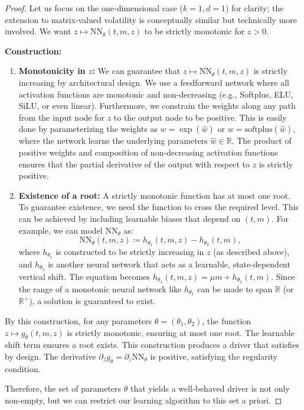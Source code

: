\documentclass[qian]{imsart}
\newcommand{\R}{\mathbb{R}}
\theoremstyle{plain}
\theoremstyle{definition}
\begin{document}
\begin{proof}
Let us focus on the one-dimensional case ($k=1, d=1$) for clarity; the extension to matrix-valued volatility is conceptually similar but technically more involved. We want $z \mapsto \text{NN}_\theta(t,m,z)$ to be strictly monotonic for $z>0$.

\textbf{Construction:}
\begin{enumerate}
    \item \textbf{Monotonicity in $z$:} We can guarantee that $z \mapsto \text{NN}_\theta(t,m,z)$ is strictly increasing by architectural design. We use a feedforward network where all activation functions are monotonic and non-decreasing (e.g., Softplus, ELU, SiLU, or even linear). Furthermore, we constrain the weights along any path from the input node for $z$ to the output node to be positive. This is easily done by parameterizing the weights as $w = \exp(\hat{w})$ or $w = \text{softplus}(\hat{w})$, where the network learns the underlying parameters $\hat{w} \in \R$. The product of positive weights and composition of non-decreasing activation functions ensures that the partial derivative of the output with respect to $z$ is strictly positive.

    \item \textbf{Existence of a root:} A strictly monotonic function has at most one root. To guarantee existence, we need the function to cross the required level. This can be achieved by including learnable biases that depend on $(t,m)$. For example, we can model $\text{NN}_\theta$ as:
    \[
        \text{NN}_\theta(t,m,z) \coloneqq h_{\theta_1}(t,m,z) - h_{\theta_2}(t,m),
    \]
    where $h_{\theta_1}$ is constructed to be strictly increasing in $z$ (as described above), and $h_{\theta_2}$ is another neural network that acts as a learnable, state-dependent vertical shift. The equation becomes $h_{\theta_1}(t,m,z) = \mu m + h_{\theta_2}(t,m)$. Since the range of a monotonic neural network like $h_{\theta_1}$ can be made to span $\R$ (or $\R^+$), a solution is guaranteed to exist.
\end{enumerate}
By this construction, for any parameters $\theta = (\theta_1, \theta_2)$, the function $z \mapsto g_\theta(t,m,z)$ is strictly monotonic, ensuring at most one root. The learnable shift term ensures a root exists. This construction produces a driver that satisfies  by design. The derivative $\partial_z g_\theta = \partial_z \text{NN}_\theta$ is positive, satisfying the regularity condition.

Therefore, the set of parameters $\theta$ that yields a well-behaved driver is not only non-empty, but we can restrict our learning algorithm to this set a priori.
\end{proof}
\end{document}
